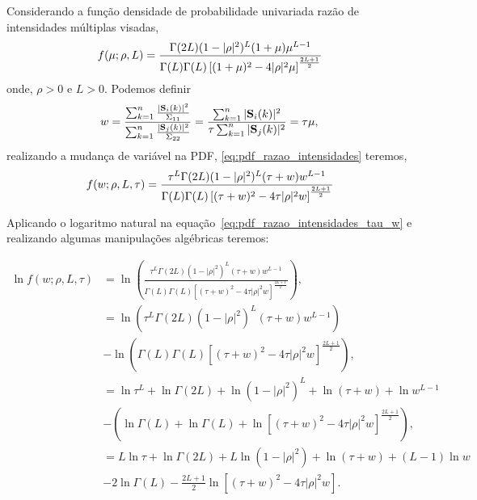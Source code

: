 Considerando a função densidade de probabilidade univariada razão de intensidades múltiplas visadas,
\begin{equation}\label{eq:pdf_razao_intensidades}
	f(\mu;\rho,L)=\frac{\Gamma(2L)(1-|\rho|^2)^{L}(1+\mu)\mu^{L-1}}{\Gamma(L)\Gamma(L)\left[(1+\mu)^2-4|\rho|^2\mu \right]^{\frac{2L+1}{2}}}\\
\end{equation}
onde, $\rho>0$ e $L>0$. 
Podemos definir 
\begin{equation}\label{eq:razao_intensidades_w}
 w=\frac{\sum_{k=1}^{n}\frac{|\mathbf{S}_i(k)|^2}{\Sigma_{11}}}{\sum_{k=1}^{n}\frac{|\mathbf{S}_j(k)|^2}{\Sigma_{22}}}=\frac{\sum_{k=1}^{n}|\mathbf{S}_i(k)|^2}{\tau\sum_{k=1}^{n}|\mathbf{S}_j(k)|^2}=\tau \mu,\\ 
\end{equation}
realizando a mudança de variável na PDF, \eqref{eq:pdf_razao_intensidades} teremos, 
\begin{equation}\label{eq:pdf_razao_intensidades_tau_w}
	f(w;\rho,L,\tau)=\frac{\tau^L\Gamma(2L)(1-|\rho|^2)^{L}(\tau+w)w^{L-1}}{\Gamma(L)\Gamma(L)\left[(\tau+w)^2-4\tau|\rho|^2w \right]^{\frac{2L+1}{2}}}\\
\end{equation}

Aplicando o logaritmo natural na equação~\eqref{eq:pdf_razao_intensidades_tau_w} e realizando algumas manipulações algébricas teremos:

\begin{equation}\nonumber
\begin{split}
	\ln f(w;\rho,L,\tau)&=\ln\left(\frac{\tau^L\Gamma(2L)(1-|\rho|^2)^{L}(\tau+w)w^{L-1}}{\Gamma(L)\Gamma(L)\left[(\tau+w)^2-4\tau|\rho|^2w \right]^{\frac{2L+1}{2}}}\right),\\
	                &=\ln\left(\tau^L\Gamma(2L)(1-|\rho|^2)^{L}(\tau+w)w^{L-1}\right)\\
	                &-\ln\left(\Gamma(L)\Gamma(L)\left[(\tau+w)^2-4\tau|\rho|^2w \right]^{\frac{2L+1}{2}}\right),\\
	                &=\ln\tau^L + \ln\Gamma(2L) +\ln(1-|\rho|^2)^{L}+\ln(\tau+w)+\ln w^{L-1}\\
	                &-\left(\ln\Gamma(L)+\ln\Gamma(L)+\ln\left[(\tau+w)^2-4\tau|\rho|^2w \right]^{\frac{2L+1}{2}}\right),\\
	                &=L\ln\tau + \ln\Gamma(2L) +L\ln(1-|\rho|^2)+\ln(\tau+w)+(L-1)\ln w\\
	                &-2\ln\Gamma(L)-\frac{2L+1}{2}\ln\left[(\tau+w)^2-4\tau|\rho|^2w \right].\\
\end{split}
\end{equation}

